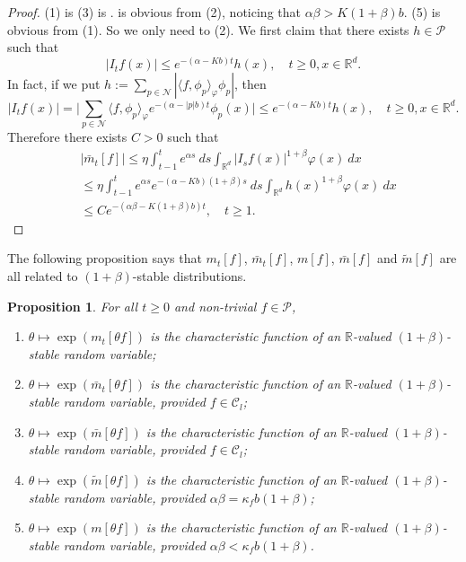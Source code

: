\documentclass[12pt,a4paper]{amsart}
\theoremstyle{plain}
\newtheorem{prop}[thm]{Proposition}
\theoremstyle{definition}
\numberwithin{equation}{section}
\begin{document}
\begin{proof}
(1) is  \cite[Lemma 2.7]{MarksMilos2018CLT} (3) is \cite[Lemma 4.2]{MarksMilos2018CLT}.
 is obvious from (2), noticing that $\alpha\beta>K(1+\beta)b$. (5) is obvious from (1).
So we only need to  (2). We first claim that there exists $h\in \mathcal{P}$ such that
\[
    \label{ineq: control of Itg}
    |I_tf(x)|
    \leq e^{-(\alpha-Kb)t}h(x),
    \quad t\geq 0, x\in \mathbb{R}^d.
\]
    In fact, if we put $h:= \sum_{p\in \mathcal N} |\langle f,\phi_p\rangle_{\varphi}\phi_p|$, then
\begin{equation}
\label{eq: supper for Itf}
    |I_tf(x)|
    =\Big|\sum_{p\in\mathcal{N}} \langle f,\phi_p\rangle_{\varphi} e^{-(\alpha-|p|b)t}\phi_p(x)\Big|
    \leq e^{-(\alpha-Kb)t}h(x),
    \quad t\geq 0,x\in \mathbb{R}^d.
\end{equation}
    Therefore there exists  $C>0$ such that
\begin{align}
     &|\bar{m}_t[f]|
    \leq \eta \int_{t-1}^{t} e^{\alpha s}~ds \int_{\mathbb R^d} | I_sf(x)|^{1+\beta}\varphi(x)~dx
    \\&\leq \eta \int_{t-1}^{t} e^{\alpha s}e^{-(\alpha-Kb)(1+\beta)s}~ds\int_{\mathbb R^d} h(x)^{1+\beta}\varphi(x)~dx
    \\&\leq C e^{-(\alpha\beta-K(1+\beta)b)t},
    \quad t\geq 1.
\end{align}
%
%
%
\end{proof}
    The following proposition says that $m_t[f]$, $\bar m_t[f]$, $m[f]$, $\bar m[f]$ and 
    $\widetilde m[f]$ 
    are all related to $(1+\beta)$-stable distributions.
\begin{prop}
\label{prop: alpha stable rv}
	For all $t\geq 0$ and non-trivial $f\in \mathcal P$,
\begin{enumerate}
\item
\label{item: stable 1}
    $\theta \mapsto \exp(m_t[\theta f])$ is the characteristic function of an $\mathbb R$-valued $(1+\beta)$-stable random variable;
\item
\label{item: stable 2}
    $\theta \mapsto \exp(\bar{m}_t[\theta f])$ is the characteristic function of an $\mathbb R$-valued $(1+\beta)$-stable random variable, provided $f \in \mathcal C_l$;
\item
\label{item: stable 3}
   $\theta \mapsto \exp(\bar m[\theta f])$
    is the characteristic function of an $\mathbb R$-valued $(1+\beta)$-stable random variable, provided $f \in \mathcal C_l$;
\item
\label{item: stable 4}
    $\theta \mapsto \exp(\widetilde m[\theta f])$ is the characteristic function of an $\mathbb R$-valued $(1+\beta)$-stable random variable, provided $\alpha\beta=\kappa_f b(1+\beta)$;
\item
\label{item: stable 5}
    $\theta \mapsto \exp(m[\theta f])$ is the characteristic function of an $\mathbb R$-valued $(1+\beta)$-stable random variable, provided $\alpha\beta < \kappa_f b(1+\beta)$.
\end{enumerate}
\end{prop}
\end{document}
